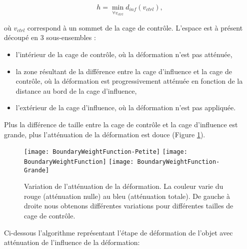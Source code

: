 \begin{equation}
  h = \min_{\forall v_{ctrl}} d_{inf}(v_{ctrl}),
\end{equation}

où $v_{ctrl}$ correspond à un sommet de la cage de contrôle. L'espace est à
présent découpé en 3 sous-ensembles : 

\begin{itemize}

\item l'intérieur de la cage de contrôle, où la déformation n'est pas atténuée,

\item la zone résultant de la différence entre la cage d'influence et la cage
de contrôle, où la déformation est progressivement atténuée en fonction de la
distance au bord de la cage d'influence,

\item l'extérieur de la cage d'influence, où la déformation n'est pas
appliquée.

\end{itemize}

Plus la différence de taille entre la cage de contrôle et la cage d'influence
est grande, plus l'atténuation de la déformation est douce (Figure
\ref{MELBou}).

\begin{figure}[!ht]
    \texttt{[image: BoundaryWeightFunction-Petite]}
    \texttt{[image: BoundaryWeightFunction]}
    \texttt{[image: BoundaryWeightFunction-Grande]}

    \caption[Variation de l'atténuation de la déformation] {Variation de
l'atténuation de la déformation. La couleur varie du rouge (atténuation nulle)
au bleu (atténuation totale). De gauche à droite nous obtenons différentes
variations pour différentes tailles de cage de contrôle.}

    \label{MELBou}
\end{figure}

Ci-dessous l'algorithme représentant l'étape de déformation de l'objet avec
atténuation de l'influence de la déformation: \\


